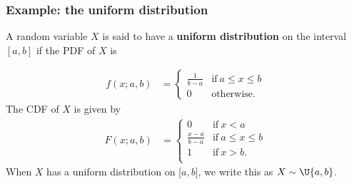 \documentclass[9pt]{beamer}
\begin{document}
\begin{frame}
\frametitle{Example: the uniform distribution}

\vspace{-.05cm}

\begin{definition}
A random variable $X$ is said to have a \textbf{uniform distribution} on the interval ${[a, b]}$ if the PDF of $X$ is

\vspace{-.5cm}

\begin{align*}
    f(x; a, b) &= 
    \begin{cases}
      \frac{1}{b-a} & \text{if}\ a \leq x \leq b \\
      0 & \text{otherwise.}
    \end{cases}
\end{align*}
The CDF of $X$ is given by
\begin{align*}
F(x; a, b) &= 
    \begin{cases}
      0 & \text{if}\ x < a \\
      \frac{x-a}{b-a} & \text{if}\ a \leq x \leq b \\
      1 &\text{if}\ x > b. \\
    \end{cases}
\end{align*}
When $X$ has a uniform distribution on [$a, b$], we write this as $X \sim \U{a,b}$. 
\end{definition}



\

\end{frame}
\end{document}
